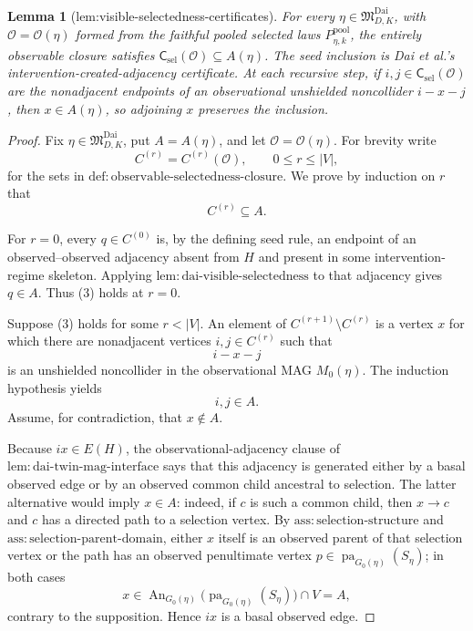 \documentclass{article}
\newtheorem{lemma}{Lemma}
\begin{document}
\begin{lemma}[lem:visible-selectedness-certificates]\label{lem:visible-selectedness-certificates}
For every \(\eta\in\mathfrak M_{D,K}^{\mathrm{Dai}}\), with \(\mathcal O=\mathcal O(\eta)\) formed from the faithful pooled selected laws \(P_{\eta,k}^{\mathrm{pool}}\), the entirely observable closure satisfies \(\mathsf C_{\mathrm{sel}}(\mathcal O)\subseteq A(\eta)\). The seed inclusion is Dai et al.'s intervention-created-adjacency certificate. At each recursive step, if \(i,j\in\mathsf C_{\mathrm{sel}}(\mathcal O)\) are the nonadjacent endpoints of an observational unshielded noncollider \(i-x-j\), then \(x\in A(\eta)\), so adjoining \(x\) preserves the inclusion.
\end{lemma}
\begin{proof}
Fix \(\eta\in\mathfrak M_{D,K}^{\mathrm{Dai}}\), put \(A=A(\eta)\), and let \(\mathcal O=\mathcal O(\eta)\).  For brevity write
\[
C^{(r)}=C^{(r)}(\mathcal O),\qquad 0\le r\le |V|,
\]
for the sets in \(\mathrm{def:observable\mbox{-}selectedness\mbox{-}closure}\).  We prove by induction on \(r\) that
\[
C^{(r)}\subseteq A.
\tag{3}
\]

For \(r=0\), every \(q\in C^{(0)}\) is, by the defining seed rule, an endpoint of an observed--observed adjacency absent from \(H\) and present in some intervention-regime skeleton.  Applying \(\mathrm{lem:dai\mbox{-}visible\mbox{-}selectedness}\) to that adjacency gives \(q\in A\).  Thus (3) holds at \(r=0\).

Suppose (3) holds for some \(r<|V|\).  An element of \(C^{(r+1)}\setminus C^{(r)}\) is a vertex \(x\) for which there are nonadjacent vertices \(i,j\in C^{(r)}\) such that
\[
i-x-j
\tag{4}
\]
is an unshielded noncollider in the observational MAG \(M_0(\eta)\).  The induction hypothesis yields
\[
i,j\in A.
\tag{5}
\]
Assume, for contradiction, that \(x\notin A\).

Because \(ix\in E(H)\), the observational-adjacency clause of \(\mathrm{lem:dai\mbox{-}twin\mbox{-}mag\mbox{-}interface}\) says that this adjacency is generated either by a basal observed edge or by an observed common child ancestral to selection.  The latter alternative would imply \(x\in A\): indeed, if \(c\) is such a common child, then \(x\to c\) and \(c\) has a directed path to a selection vertex.  By \(\mathrm{ass:selection\mbox{-}structure}\) and \(\mathrm{ass:selection\mbox{-}parent\mbox{-}domain}\), either \(x\) itself is an observed parent of that selection vertex or the path has an observed penultimate vertex \(p\in\operatorname{pa}_{G_0(\eta)}(S_\eta)\); in both cases
\[
x\in\operatorname{An}_{G_0(\eta)}
   \bigl(\operatorname{pa}_{G_0(\eta)}(S_\eta)\bigr)\cap V
=A,
\]
contrary to the supposition.  Hence \(ix\) is a basal observed edge.


\end{proof}
\end{document}

